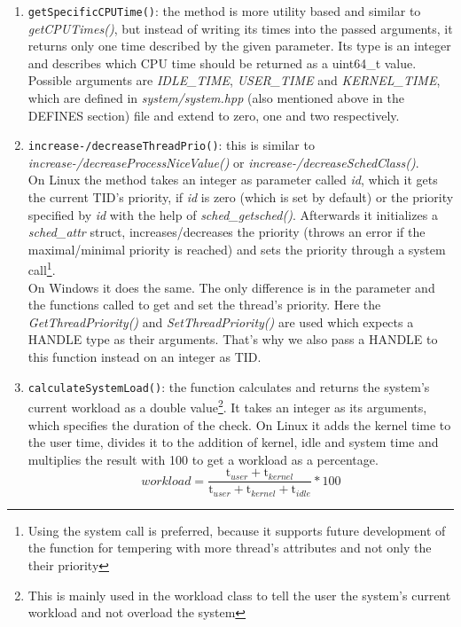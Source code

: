 \begin{enumerate}
\begin{enumerate}
		On Windows it returns the given argument multiplied by 0.1, which also represents the time in milliseconds.
		\item \texttt{getSpecificCPUTime()}: the method is more utility based and similar to \textit{getCPUTimes()}, but instead of writing its times into the passed arguments, it returns only one time described by the given parameter. Its type is an integer and describes which CPU time should be returned as a uint64\_t value. Possible arguments are \textit{IDLE\_TIME}, \textit{USER\_TIME} and \textit{KERNEL\_TIME}, which are defined in \textit{system/system.hpp} (also mentioned above in the DEFINES section) file and extend to zero, one and two respectively.
		\item \texttt{increase-/decreaseThreadPrio()}: this is similar to \textit{increase-/decreaseProcessNiceValue()} or \textit{increase-/decreaseSchedClass()}.\\
		On Linux the method takes an integer as parameter called \textit{id}, which it gets the current TID's priority, if \textit{id} is zero (which is set by default) or the priority specified by \textit{id} with the help of \textit{sched\_getsched()}. Afterwards it initializes a \textit{sched\_attr} struct, increases/decreases the priority (throws an error if the maximal/minimal priority is reached) and sets the priority through a system call\footnote{Using the system call is preferred, because it supports future development of the function for tempering with more thread's attributes and not only the their priority}. \\
		On Windows it does the same. The only difference is in the parameter and the functions called to get and set the thread's priority. Here the \textit{GetThreadPriority()} and \textit{SetThreadPriority()} are used which expects a HANDLE type as their arguments. That's why we also pass a HANDLE to this function instead on an integer as TID.    
		\item \texttt{calculateSystemLoad()}: the function calculates and returns the system's current workload as a double value\footnote{This is mainly used in the workload class to tell the user the system's current workload and not overload the system}. It takes an integer as its arguments, which specifies the duration of the check.
		On Linux it adds the kernel time to the user time, divides it to the addition of kernel, idle and system time and multiplies the result with 100 to get a workload as a percentage. 
		\begin{equation}
		workload =  \frac{\mathrm{t}_{user}+\mathrm{t}_{kernel}}{\mathrm{t}_{user}+\mathrm{t}_{kernel}+\mathrm{t}_{idle}}*100

\end{equation}
\end{enumerate}
\end{enumerate}
